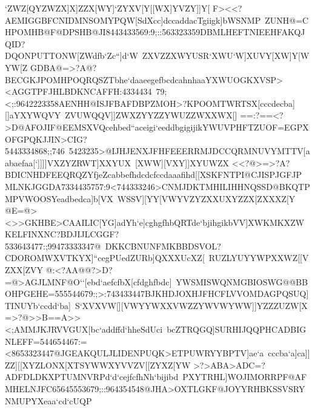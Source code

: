 {{{ `ZWZ[QYZWZX]X]ZZX[WY]`ZYXV[Y[[WX]YVZY]]Y[}
 \hbox{F><<?AEMIGGBFCNIDMNSOMYPQW[SdXcc]dccaddacTgiigk]bWSNMP%
 ZUNH@=CHPOMHB@F@DPSHB@JI8443433569:9;::563323359DBMLHEFTNIEEHFAKQJQID?DQONPUTTONW[ZWdfb`Zc``]d`W%
 ZXVZZXWYUSR`XWU`W]XUVY[XW]Y[WYW[Z}
 \hbox{GDBA@=>?A@?BECGKJPOMHPOQRQSZTbhe`daaeegefbcdcahnhaaYXWUOGKXVSP><AGGTPFJHLBDKNCAFFH:4334434%
 79;<;:9642223358AENHH@ISJFBAFDBPZMOH>?KPOOMTWRTSX[cccdecba][]aYXYWQVY%
 ZVUWQQV]]ZWXZYYZZYWUZZWXXWX[]}
 \hbox{==:?==<?>D@AFOJIF@EEMSXVQcehbed``aceigi`eeddbgigijikYWUVPHFTZUOF=EGPXOFGPQKJJIN>CIG?5443334868;;746%
 5423235>@IJHJENXJFHFEEERRMJDCCQRMNUVYMTTV[aabaefaa[`]]]]VXZYZRWT]XXYUX%
 [XWW][VXY]]XYUWZX}
 \hbox{<<?@>=>?A?BDICNHDFEEQRQZYfjeZcabbefhdcdcfccdaaafihd[[XSKFNTPI@CJISPJGFJP%
 MLNKJGGDA7334435757:9<744333246>CNMJDKTMHILIHHNQSSD@BKQTPMPVWOOSYeadbedca]b[VX%
 WSSV][YY[VWYVZYZXXUXYZZX[ZXXXZ[Y}
 \hbox{@E=@><>>GKHBE>CAAILIC[YG]adYh`e]cghgfhbQRTde`bjihgikbVV]XWKMKXZWKELFINXNC?BDJIJLCGGF?533643477:;99473333347@%
 DKKCBNUNFMKBBDSVOL?CDOROMWXVTKYX]``cegPUedZURb]QXXXUcXZ[%
 RUZLYUYYWPXXWZ[[VZXX[ZVY}
 \hbox{@:<?AA@@?>D?=@>AGJLMNF@O``[ebd`aefcfbX[cfdghfbdc]%
 YWSMISWQNMGBIOSWG@@BBOHPGEHE=555544679:;>:743433447BJKHDJOXHJFHCFLVVOMDAGPQSUQ]TINUYb`ccdd`ba]%
 S`XVXVW[][VWYYWXXVWZZYWVWYWW]]YZZZUZW[X}
 \hbox{=>?@>>B==A>><;AMMJKJRVVGUX[bc`addffd`hheSdUci%
 bcZTRQGQ]SURHIJQQPHCADBIGNLEFF=544654467:=<8653323447@JGEAKQULJLIDENPUQK>ETPUWRYYBPTV]ae`a%
 cccba`a]ca]]ZZ][[XYZLONX[XTSYWWXYVVZV[[ZYXZ[YW}
 \hbox{>?>ABA>ADC=?ADFDLDKXPTUMNVRPd`d`cejfcfhNh`bijibd%
 PXYTRHL]WOJIMORRPF@AFMHELNJFC65645553679;::964354548@JHA>OXTLGKF@JOYYRHBKSSVSRYNMUPYXeaa`cd`cUQP%
}}}
